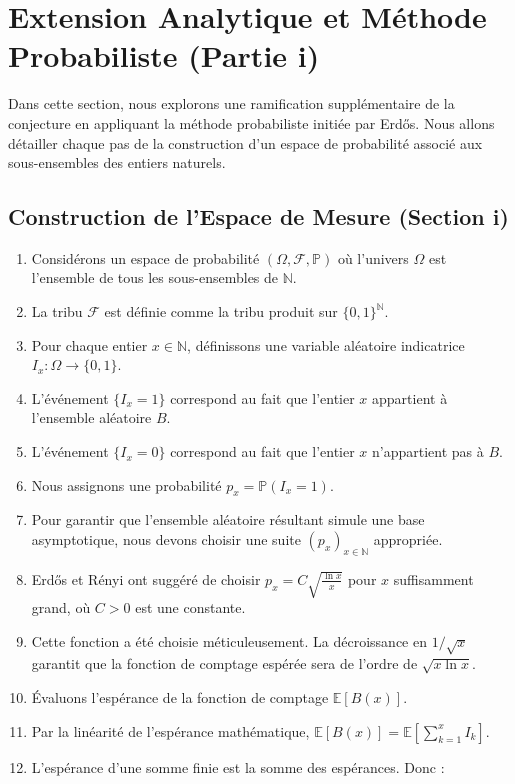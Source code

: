 
\section{Extension Analytique et Méthode Probabiliste (Partie {i})}
Dans cette section, nous explorons une ramification supplémentaire de la conjecture en appliquant la méthode probabiliste initiée par Erdős. Nous allons détailler chaque pas de la construction d'un espace de probabilité associé aux sous-ensembles des entiers naturels.

\subsection{Construction de l'Espace de Mesure (Section {i})}
\begin{enumerate}
    \item Considérons un espace de probabilité $(\Omega, \mathcal{F}, \mathbb{P})$ où l'univers $\Omega$ est l'ensemble de tous les sous-ensembles de $\mathbb{N}$.
    \item La tribu $\mathcal{F}$ est définie comme la tribu produit sur $\{0, 1\}^{\mathbb{N}}$.
    \item Pour chaque entier $x \in \mathbb{N}$, définissons une variable aléatoire indicatrice $I_x : \Omega \to \{0, 1\}$.
    \item L'événement $\{I_x = 1\}$ correspond au fait que l'entier $x$ appartient à l'ensemble aléatoire $B$.
    \item L'événement $\{I_x = 0\}$ correspond au fait que l'entier $x$ n'appartient pas à $B$.
    \item Nous assignons une probabilité $p_x = \mathbb{P}(I_x = 1)$.
    \item Pour garantir que l'ensemble aléatoire résultant simule une base asymptotique, nous devons choisir une suite $(p_x)_{x \in \mathbb{N}}$ appropriée.
    \item Erdős et Rényi ont suggéré de choisir $p_x = C \sqrt{\frac{\ln x}{x}}$ pour $x$ suffisamment grand, où $C > 0$ est une constante.
    \item Cette fonction a été choisie méticuleusement. La décroissance en $1/\sqrt{x}$ garantit que la fonction de comptage espérée sera de l'ordre de $\sqrt{x \ln x}$.
    \item Évaluons l'espérance de la fonction de comptage $\mathbb{E}[B(x)]$.
    \item Par la linéarité de l'espérance mathématique, $\mathbb{E}[B(x)] = \mathbb{E}[\sum_{k=1}^x I_k]$.
    \item L'espérance d'une somme finie est la somme des espérances. Donc :

\end{enumerate}
